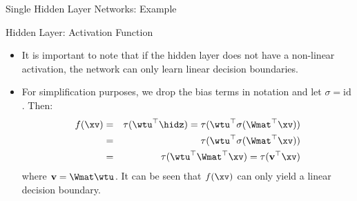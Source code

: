 \begin{frame} {Single Hidden Layer Networks: Example}
\begin{figure}
  \end{figure}
\end{frame}

\begin{frame} {Hidden Layer: Activation Function}
  \begin{itemize}
    \item It is important to note that if the hidden layer does not have a non-linear activation, the network can only learn linear decision boundaries.
    \item For simplification purposes, we drop the bias terms in notation and let $\sigma = \text{id}$. Then:
    \begin{eqnarray*}
        f(\xv) & = & \tau(\wtu^\top \hidz) = \tau(\wtu^\top \sigma(\Wmat^\top \xv)) \\
         & = & \tau(\wtu^\top \sigma(\Wmat^\top \xv)) \\
         & = & \tau(\wtu^\top\Wmat^\top \xv) = \tau(\mathbf{v}^\top \xv)
      \end{eqnarray*}
      where $ \mathbf{v} = \Wmat\wtu$. It can be seen that $f(\xv)$ can only yield a linear decision boundary.
  \end{itemize}
\end{frame}

